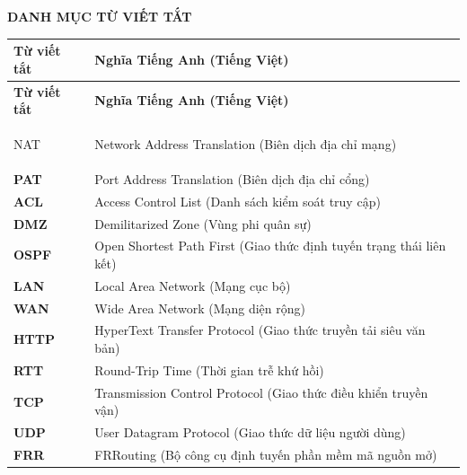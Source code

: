\begin{center}
    \fontsize{20pt}{0pt}\selectfont \textbf{DANH MỤC TỪ VIẾT TẮT}
    \vspace{0.5cm}
\end{center}

\begin{longtable}{|>{\bfseries}p{3cm}|p{11.5cm}|}
    \hline
    \rowcolor[HTML]{2C3E50} 
    \color{white} \textbf{Từ viết tắt} & \color{white} \textbf{Nghĩa Tiếng Anh (Tiếng Việt)} \\ \hline
    \endfirsthead

    \hline
    \rowcolor[HTML]{2C3E50} 
    \color{white} \textbf{Từ viết tắt} & \color{white} \textbf{Nghĩa Tiếng Anh (Tiếng Việt)} \\ \hline
    \endhead

    \hline
    \endfoot

    NAT  & Network Address Translation (Biên dịch địa chỉ mạng) \\ \hline
    PAT  & Port Address Translation (Biên dịch địa chỉ cổng) \\ \hline
    ACL  & Access Control List (Danh sách kiểm soát truy cập) \\ \hline
    DMZ  & Demilitarized Zone (Vùng phi quân sự) \\ \hline
    OSPF & Open Shortest Path First (Giao thức định tuyến trạng thái liên kết) \\ \hline
    LAN  & Local Area Network (Mạng cục bộ) \\ \hline
    WAN  & Wide Area Network (Mạng diện rộng) \\ \hline
    HTTP & HyperText Transfer Protocol (Giao thức truyền tải siêu văn bản) \\ \hline
    RTT  & Round-Trip Time (Thời gian trễ khứ hồi) \\ \hline
    TCP  & Transmission Control Protocol (Giao thức điều khiển truyền vận) \\ \hline
    UDP  & User Datagram Protocol (Giao thức dữ liệu người dùng) \\ \hline
    FRR  & FRRouting (Bộ công cụ định tuyến phần mềm mã nguồn mở) \\ \hline

\end{longtable}

\newpage